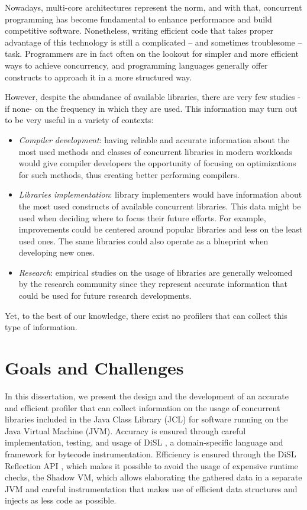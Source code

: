 \documentclass[]{usiinfthesis}
\begin{document}
Nowadays, multi-core architectures represent the norm, and with that, concurrent programming has become fundamental to enhance performance and build competitive software. Nonetheless, writing efficient code that takes proper advantage of this technology is still a complicated -- and sometimes troublesome -- task. Programmers are in fact often on the lookout for simpler and more efficient ways to achieve concurrency, and programming languages generally offer constructs to approach it in a more structured way. 

However, despite the abundance of available libraries, there are very few studies -if none- on the frequency in which they are used. This information may turn out to be very useful in a variety of contexts:

\begin{itemize}
    \item \textit{Compiler development}: having reliable and accurate information about the most used methods and classes of concurrent libraries in modern workloads would give compiler developers the opportunity of focusing on optimizations for such methods, thus creating better performing compilers. %
    \item \textit{Libraries implementation}: library implementers would have information about the most used constructs of available concurrent libraries. This data might be used when deciding where to focus their future efforts. For example, improvements could be centered around popular libraries and less on the least used ones. The same libraries could also operate as a blueprint when developing new ones.
    \item \textit{Research}: empirical studies on the usage of libraries are generally welcomed by the research community since they represent accurate information that could be used for future research developments.
\end{itemize}
Yet, to the best of our knowledge, there exist no profilers that can collect this type of information. 

\section{Goals and Challenges} \label{sec:1.2}
In this dissertation, we present the design and the development of an accurate and efficient profiler that can collect information on the usage of concurrent libraries included in the Java Class Library (JCL) for software running on the Java Virtual Machine (JVM). Accuracy is ensured through careful implementation, testing, and usage of DiSL \cite{DiSL}, a domain-specific language and framework for bytecode instrumentation. Efficiency is ensured through the DiSL Reflection API \cite{DiSLReflectionAPI}, which makes it possible to avoid the usage of expensive runtime checks, the Shadow VM, which allows elaborating the gathered data in a separate JVM and careful instrumentation that makes use of efficient data structures and injects as less code as possible.
\end{document}
